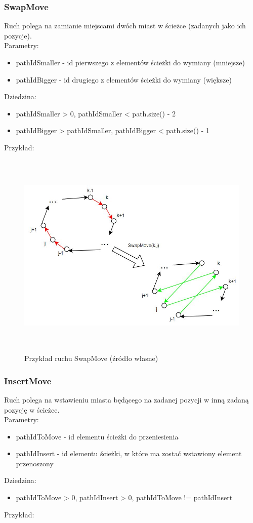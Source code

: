 \documentclass[a4paper,11pt]{article}
\begin{document}
\subsubsection{SwapMove}
Ruch polega na zamianie miejscami dwóch miast  w ścieżce (zadanych jako ich pozycje).\\[0.3cm]
Parametry: 
\begin{itemize}
\item pathIdSmaller - id pierwszego z elementów ścieżki do wymiany (mniejsze)
\item pathIdBigger - id drugiego z elementów ścieżki do wymiany (większe)
\end{itemize}
Dziedzina: 
\begin{itemize}
\item pathIdSmaller > 0, pathIdSmaller < path.size() - 2
\item pathIdBigger > pathIdSmaller, pathIdBigger < path.size() - 1

\end{itemize}
Przykład:

\begin{figure}[H]
\centering
\includegraphics[height=10cm]{SwapMove.JPG}
\caption{Przykład ruchu SwapMove (źródło własne)}
\end{figure}

\newpage
\subsubsection{InsertMove}
Ruch polega na wstawieniu miasta będącego na zadanej pozycji w inną zadaną pozycję w ścieżce.\\[0.3cm]
Parametry: 
\begin{itemize}
\item pathIdToMove - id elementu ścieżki do przeniesienia
\item pathIdInsert - id elementu ścieżki, w które ma zostać wstawiony element przenoszony
\end{itemize}
Dziedzina: 
\begin{itemize}
\item pathIdToMove > 0, pathIdInsert > 0, pathIdToMove != pathIdInsert

\end{itemize}
Przykład:
\end{document}
